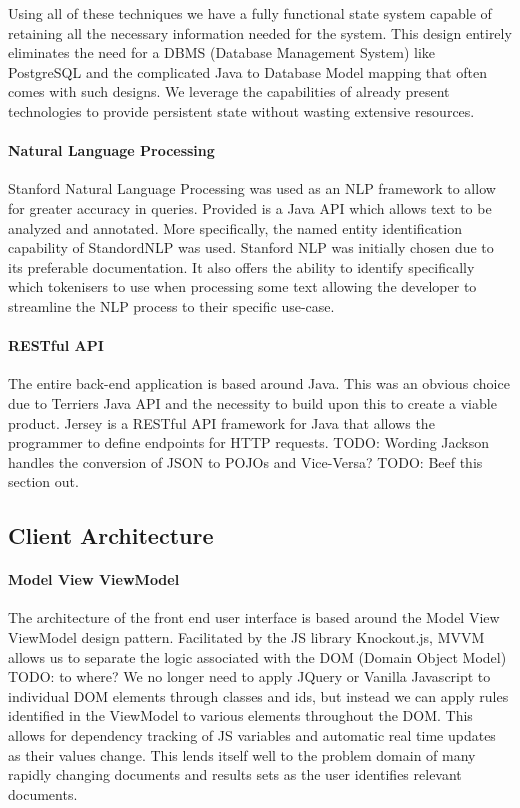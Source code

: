 \documentclass{l4proj}
\begin{document}
Using all of these techniques we have a fully functional state system capable of retaining all the necessary information needed for the system.
This design entirely eliminates the need for a DBMS (Database Management System) like PostgreSQL and the complicated Java to Database Model mapping that often comes with such designs.
We leverage the capabilities of already present technologies to provide persistent state without wasting extensive resources.

\paragraph{Natural Language Processing}
Stanford Natural Language Processing was used as an NLP framework to allow for greater accuracy in queries. Provided is a Java API which allows text to be analyzed and annotated. More specifically, the named entity identification capability of StandordNLP was used.
Stanford NLP was initially chosen due to its preferable documentation. It also offers the ability to identify specifically which tokenisers to use when processing some text allowing the developer to streamline the NLP process to their specific use-case.

\paragraph{RESTful API}
The entire back-end application is based around Java. This was an obvious choice due to Terriers Java API and the necessity to build upon this to create a viable product.
Jersey is a RESTful API framework for Java that allows the programmer to define endpoints for HTTP requests. TODO: Wording
Jackson handles the conversion of JSON to POJOs and Vice-Versa? TODO: Beef this section out.

\subsection{Client Architecture}
\paragraph{Model View ViewModel}
The architecture of the front end user interface is based around the Model View ViewModel design pattern. Facilitated by the JS library Knockout.js, MVVM allows us to separate the logic associated with the DOM (Domain Object Model) TODO: to where?
We no longer need to apply JQuery or Vanilla Javascript to individual DOM elements through classes and ids, but instead we can apply rules identified in the ViewModel to various elements throughout the DOM. This allows for dependency tracking of JS variables and automatic real time updates as their values change.
This lends itself well to the problem domain of many rapidly changing documents and results sets as the user identifies relevant documents.
\end{document}
